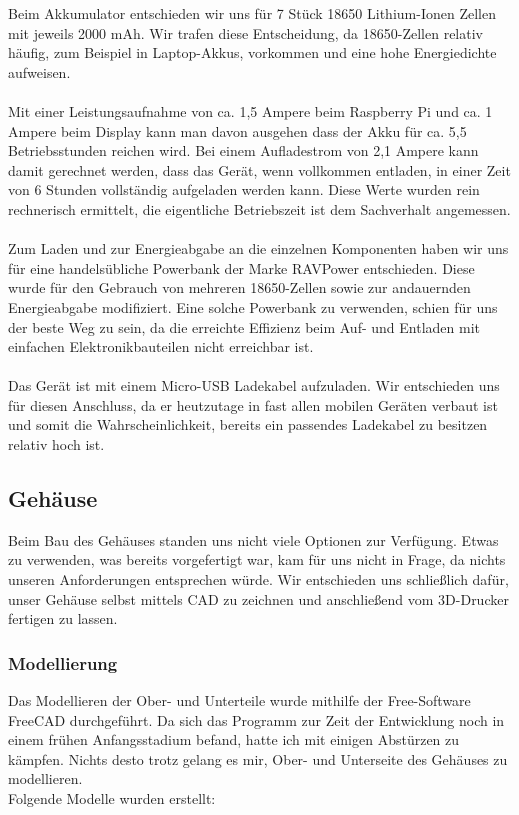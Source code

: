 Beim Akkumulator entschieden wir uns für 7 Stück 18650 Lithium-Ionen Zellen mit jeweils 2000 mAh. Wir trafen diese Entscheidung, da 18650-Zellen relativ häufig, zum Beispiel in Laptop-Akkus, vorkommen und eine hohe Energiedichte aufweisen.\\
\\
Mit einer Leistungsaufnahme von ca. 1,5 Ampere beim Raspberry Pi und ca. 1 Ampere beim Display kann man davon ausgehen dass der Akku für ca. 5,5 Betriebsstunden reichen wird. Bei einem Aufladestrom von 2,1 Ampere kann damit gerechnet werden, dass das Gerät, wenn vollkommen entladen, in einer Zeit von 6 Stunden vollständig aufgeladen werden kann. Diese Werte wurden rein rechnerisch ermittelt, die eigentliche Betriebszeit ist dem Sachverhalt angemessen.\\
\\
Zum Laden und zur Energieabgabe an die einzelnen Komponenten haben wir uns für eine handelsübliche Powerbank der Marke RAVPower entschieden. Diese wurde für den Gebrauch von mehreren 18650-Zellen sowie zur andauernden Energieabgabe modifiziert. Eine solche Powerbank zu verwenden, schien für uns der beste Weg zu sein, da die erreichte Effizienz beim Auf- und Entladen mit einfachen Elektronikbauteilen nicht erreichbar ist.\\
\\
Das Gerät ist mit einem Micro-USB Ladekabel aufzuladen. Wir entschieden uns für diesen Anschluss, da er heutzutage in fast allen mobilen Geräten verbaut ist und somit die Wahrscheinlichkeit, bereits ein passendes Ladekabel zu besitzen relativ hoch ist.\\

\subsection{Gehäuse}

Beim Bau des Gehäuses standen uns nicht viele Optionen zur Verfügung. Etwas zu verwenden, was bereits vorgefertigt war, kam für uns nicht in Frage, da nichts unseren Anforderungen entsprechen würde. Wir entschieden uns schließlich dafür, unser Gehäuse selbst mittels CAD zu zeichnen und anschließend vom 3D-Drucker fertigen zu lassen.\\

\subsubsection{Modellierung}
Das Modellieren der Ober- und Unterteile wurde mithilfe der Free-Software FreeCAD durchgeführt. Da sich das Programm zur Zeit der Entwicklung noch in einem frühen Anfangsstadium befand, hatte ich mit einigen Abstürzen zu kämpfen. Nichts desto trotz gelang es mir, Ober- und Unterseite des Gehäuses zu modellieren.\\
Folgende Modelle wurden erstellt:

